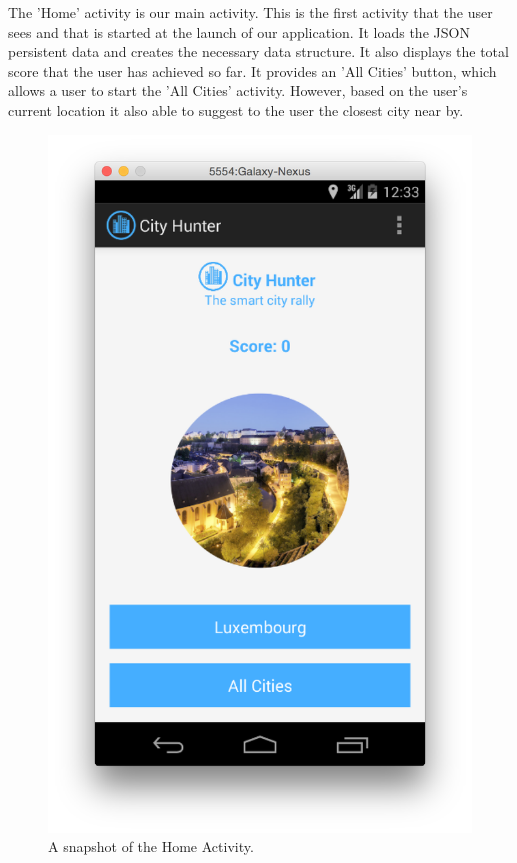 The 'Home' activity is our main activity. This is the first activity that the user sees and that is started at the launch of our application. It loads the JSON persistent data and creates the necessary data structure. It also displays the total score that the user has achieved so far. It provides an 'All Cities' button, which allows a user to start the 'All Cities' activity. However, based on the user's current location it also able to suggest to the user the closest city near by.

\begin{figure}[H]
	\centering
	\includegraphics[scale=0.4]{Figures/HomeActivity}
	\caption{A snapshot of the Home Activity.}
\end{figure}


